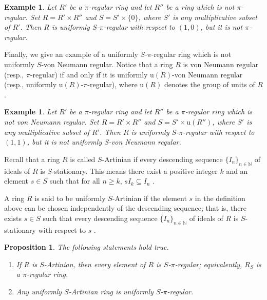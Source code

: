 \documentclass[12pt]{article}
\newtheorem{prop}[thm]{\bf Proposition}
\newtheorem{exmp}[thm]{\bf Example}
\def\u{\mathrm{u}}
\begin{document}
\begin{exmp}\label{exmp-u-s-pi-not-pi}
Let \( R' \) be a \( \pi \)-regular ring and let \( R'' \) be a ring which is not \( \pi \)-regular.  
Set \( R=R'\times R'' \) and \( S=S'\times \{0\} \), where \( S' \) is any multiplicative subset of \( R' \).  
Then \( R \) is uniformly \( S \)-\( \pi \)-regular with respect to \( (1,0) \), but it is not \( \pi \)-regular.
\end{exmp}

Finally, we give an example of a uniformly \( S \)-\( \pi \)-regular ring which is not uniformly \( S \)-von Neumann regular.  Notice that a ring \( R \) is von Neumann regular (resp., \( \pi \)-regular) if and only if it is uniformly \( \u(R) \)-von Neumann regular (resp., uniformly \( \u(R) \)-\( \pi \)-regular), where \( \u(R) \) denotes the group of units of \( R \).

\begin{exmp}\label{exmp-u-s-pi-not-u-s-von-reg}
Let \( R' \) be a \( \pi \)-regular ring and let \( R'' \) be a \( \pi \)-regular ring which is not von Neumann regular.  
Set \( R=R'\times R'' \) and \( S=S'\times \u(R'') \), where \( S' \) is any multiplicative subset of \( R' \).  
Then \( R \) is uniformly \( S \)-\( \pi \)-regular with respect to \( (1,1) \), but it is not uniformly \( S \)-von Neumann regular.
\end{exmp}

Recall that a ring \(R\) is called \(S\)-Artinian if every descending sequence \(\{I_n\}_{n \in \mathbb{N}}\) of ideals of \(R\) is \(S\)-stationary. This means there exist a positive integer \(k\) and an element \(s \in S\) such that for all \(n \geq k\), \(sI_k \subseteq I_n\) \cite{Sev1}.  

A ring \(R\) is said to be uniformly \(S\)-Artinian if the element \(s\) in the definition above can be chosen independently of the descending sequence; that is, there exists \(s \in S\) such that every descending sequence \(\{I_n\}_{n \in \mathbb{N}}\) of ideals of \(R\) is \(S\)-stationary with respect to \(s\) \cite{Zha7}.  

\begin{prop}\label{r4}
The following statements hold true.
\begin{enumerate}
\item If \(R\) is \(S\)-Artinian, then every element of \(R\) is \(S\)-\(\pi\)-regular; equivalently, \(R_S\) is a \(\pi\)-regular ring.  
\item Any uniformly \(S\)-Artinian ring is uniformly \(S\)-\(\pi\)-regular.  
\end{enumerate}
\end{prop}
\end{document}
